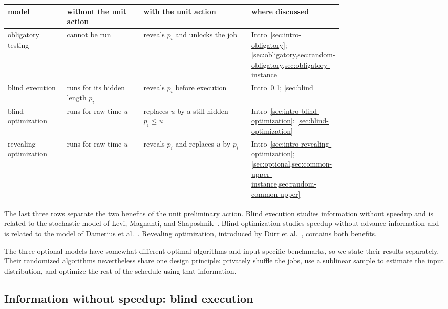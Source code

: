 \begin{center}
\small
\setlength{\tabcolsep}{4pt}
\renewcommand{\arraystretch}{1.12}
\begin{tabular}{@{}|L{0.18\linewidth}|L{0.24\linewidth}|L{0.34\linewidth}|L{\arrayrulewidth\relax}|@{}}
\hline
model & without the unit action & with the unit action & where discussed \\
\hline
obligatory testing & cannot be run & reveals $p_i$ and unlocks the job
 & Intro~\ref{sec:intro-obligatory};
   \cref{sec:obligatory,sec:random-obligatory,sec:obligatory-instance} \\
\hline
blind execution & runs for its hidden length $p_i$ & reveals $p_i$ before execution
 & Intro~\ref{sec:intro-blind}; \cref{sec:blind} \\
\hline
blind optimization & runs for raw time $u$ & replaces $u$ by a still-hidden $p_i\leq u$
 & Intro~\ref{sec:intro-blind-optimization}; \cref{sec:blind-optimization} \\
\hline
revealing optimization & runs for raw time $u$ & reveals $p_i$ and replaces $u$ by $p_i$
 & Intro~\ref{sec:intro-revealing-optimization}; \cref{sec:optional,sec:common-upper-instance,sec:random-common-upper} \\
\hline
\end{tabular}
\end{center}

The last three rows separate the two benefits of the unit preliminary action.
Blind execution studies information without speedup and is related to the
stochastic model of Levi, Magnanti, and
Shaposhnik~\cite{LeviMagnantiShaposhnik2019}.  Blind optimization studies
speedup without advance information and is related to the model of Damerius
et al.~\cite{DameriusEtAl2023}.  Revealing optimization, introduced by
D{\"u}rr et al.~\cite{DurrErlebachMegowMeissner2020}, contains both benefits.

The three optional models have somewhat different optimal algorithms and
input-specific benchmarks, so we state their results separately.  Their
randomized algorithms nevertheless share one design principle: privately
shuffle the jobs, use a sublinear sample to estimate the input distribution,
and optimize the rest of the schedule using that information.

\subsection{Information without speedup: blind execution}
\label{sec:intro-blind}

